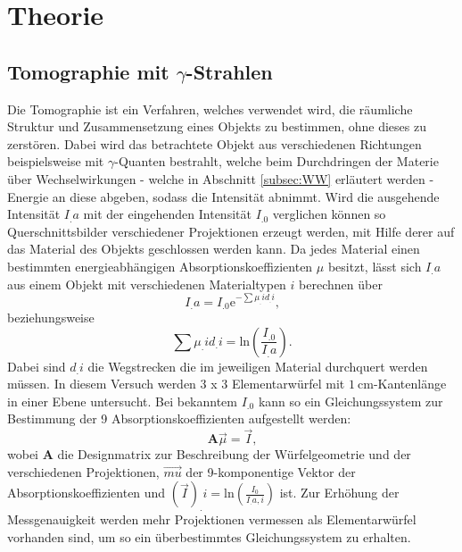 \section{Theorie}
\label{sec:Theorie}

\subsection{Tomographie mit $\gamma$-Strahlen}
\label{subsec:tomographie}

Die Tomographie ist ein Verfahren, welches verwendet wird, die räumliche Struktur und Zusammensetzung eines Objekts zu bestimmen, ohne dieses zu zerstören. Dabei wird das betrachtete Objekt aus verschiedenen Richtungen beispielsweise mit $\gamma$-Quanten bestrahlt, welche beim Durchdringen der Materie über Wechselwirkungen - welche in Abschnitt \ref{subsec:WW} erläutert werden - Energie an diese abgeben, sodass die Intensität abnimmt. Wird die ausgehende Intensität $I_.a$ mit der eingehenden Intensität $I_.0$ verglichen können so Querschnittsbilder verschiedener Projektionen erzeugt werden, mit Hilfe derer auf das Material des Objekts geschlossen werden kann. Da jedes Material einen bestimmten energieabhängigen Absorptionskoeffizienten $\mu$ besitzt, lässt sich $I_.a$ aus einem Objekt mit verschiedenen Materialtypen $i$ berechnen über
\begin{equation}
I_.a = I_.0\mathrm{e}^{-\sum \mu_.i d_.i}\text{,}\label{eq:Ia}
\end{equation}
beziehungsweise
\begin{equation}
\sum \mu_.i d_.i = \mathrm{ln}\left(\frac{I_.0}{I_.a}\right)\text{.}\label{eq:mu1}
\end{equation}
Dabei sind $d_.i$ die Wegstrecken die im jeweiligen Material durchquert werden müssen.
In diesem Versuch werden 3 x 3 Elementarwürfel mit $\SI{1}{\centi\meter}$-Kantenlänge in einer Ebene untersucht. Bei bekanntem $I_.0$ kann so ein Gleichungssystem zur Bestimmung der 9 Absorptionskoeffizienten aufgestellt werden:
\begin{equation*}
\mathbf{A}\vec{\mu} = \vec{I}\text{,}
\end{equation*}
wobei $\mathbf{A}$ die Designmatrix zur Beschreibung der Würfelgeometrie und der verschiedenen Projektionen, $\vec{mu}$ der 9-komponentige Vektor der Absorptionskoeffizienten und $\left(\vec{I}\right)_.i= \mathrm{ln}\left(\frac{I_0}{I_.{a,i}}\right)$ ist.
Zur Erhöhung der Messgenauigkeit werden mehr Projektionen vermessen als Elementarwürfel vorhanden sind, um so ein überbestimmtes Gleichungssystem zu erhalten.
